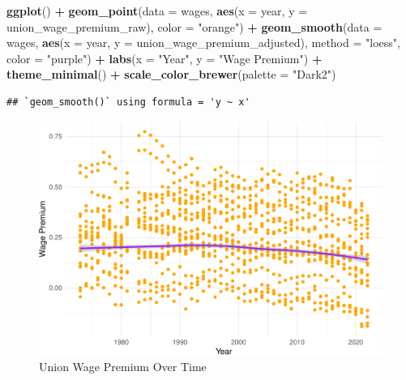\documentclass[
]{book}
\newenvironment{Shaded}{\begin{snugshade}}{\end{snugshade}}
\newcommand{\AttributeTok}[1]{\textcolor[rgb]{0.13,0.29,0.53}{#1}}
\newcommand{\FunctionTok}[1]{\textcolor[rgb]{0.13,0.29,0.53}{\textbf{#1}}}
\newcommand{\NormalTok}[1]{#1}
\newcommand{\SpecialCharTok}[1]{\textcolor[rgb]{0.81,0.36,0.00}{\textbf{#1}}}
\newcommand{\StringTok}[1]{\textcolor[rgb]{0.31,0.60,0.02}{#1}}
\theoremstyle{definition}
\theoremstyle{definition}
\theoremstyle{definition}
\theoremstyle{definition}
\theoremstyle{remark}
\begin{document}
\begin{Shaded}
\begin{Highlighting}[]
\FunctionTok{ggplot}\NormalTok{() }\SpecialCharTok{+}
  \FunctionTok{geom\_point}\NormalTok{(}\AttributeTok{data =}\NormalTok{ wages, }\FunctionTok{aes}\NormalTok{(}\AttributeTok{x =}\NormalTok{ year, }\AttributeTok{y =}\NormalTok{ union\_wage\_premium\_raw), }
             \AttributeTok{color =} \StringTok{"orange"}\NormalTok{) }\SpecialCharTok{+}
  \FunctionTok{geom\_smooth}\NormalTok{(}\AttributeTok{data =}\NormalTok{ wages, }
  \FunctionTok{aes}\NormalTok{(}\AttributeTok{x =}\NormalTok{ year, }
      \AttributeTok{y =}\NormalTok{ union\_wage\_premium\_adjusted), }\AttributeTok{method =} \StringTok{"loess"}\NormalTok{, }\AttributeTok{color =} \StringTok{"purple"}\NormalTok{) }\SpecialCharTok{+}
  \FunctionTok{labs}\NormalTok{(}\AttributeTok{x =} \StringTok{"Year"}\NormalTok{, }\AttributeTok{y =} \StringTok{"Wage Premium"}\NormalTok{) }\SpecialCharTok{+}
  \FunctionTok{theme\_minimal}\NormalTok{() }\SpecialCharTok{+}
  \FunctionTok{scale\_color\_brewer}\NormalTok{(}\AttributeTok{palette =} \StringTok{"Dark2"}\NormalTok{)}
\end{Highlighting}
\end{Shaded}

\begin{verbatim}
## `geom_smooth()` using formula = 'y ~ x'
\end{verbatim}

\begin{figure}
\centering
\includegraphics{_main_files/figure-latex/unionpremiumtime-1.pdf}
\caption{\label{fig:unionpremiumtime}Union Wage Premium Over Time}
\end{figure}
\end{document}
